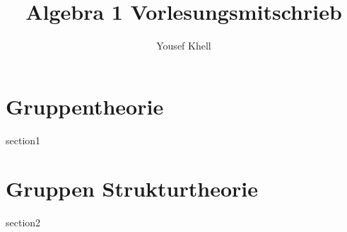 \documentclass[a4paper]{book}
\title{\vspace{-2cm} Algebra 1 Vorlesungsmitschrieb}
\author{Yousef Khell}
\begin{document}
\maketitle
\tableofcontents

\chapter{Gruppentheorie}
{section1}

\chapter{Gruppen Strukturtheorie}
{section2}
\end{document}
